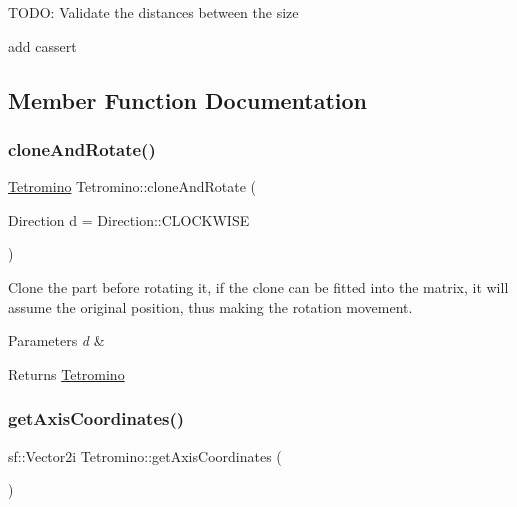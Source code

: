 T\+O\+DO\+: Validate the distances between the size

add cassert

\subsection{Member Function Documentation}
\mbox{\label{classTetromino_aaf9f42f0c7432becc4e5f8fe47575f1b}} 
\subsubsection{\texorpdfstring{clone\+And\+Rotate()}{cloneAndRotate()}}
{\footnotesize\ttfamily \hyperlink{classTetromino}{Tetromino} Tetromino\+::clone\+And\+Rotate (\begin{DoxyParamCaption}\item[{Direction}]{d = {\ttfamily Direction\+:\+:CLOCKWISE} }\end{DoxyParamCaption})}



Clone the part before rotating it, if the clone can be fitted into the matrix, it will assume the original position, thus making the rotation movement. 


\begin{DoxyParams}{Parameters}
{\em d} & \\
\hline
\end{DoxyParams}
\begin{DoxyReturn}{Returns}
\hyperlink{classTetromino}{Tetromino} 
\end{DoxyReturn}
\mbox{\label{classTetromino_a6bcb8f93c3259bfba0bfa380c900af8a}} 
\subsubsection{\texorpdfstring{get\+Axis\+Coordinates()}{getAxisCoordinates()}}
{\footnotesize\ttfamily sf\+::\+Vector2i Tetromino\+::get\+Axis\+Coordinates (\begin{DoxyParamCaption}{ }\end{DoxyParamCaption})}



